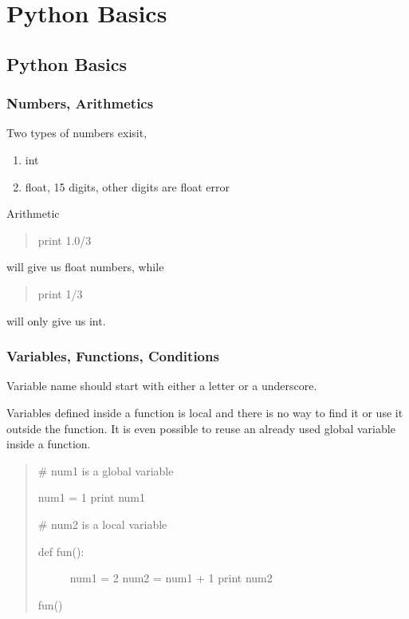 \documentclass[letterpaper,12pt,english]{sphinxmanual}
\begin{document}
\chapter{Python Basics}
\label{\detokenize{python/index::doc}}\label{\detokenize{python/index:python-basics}}

\section{Python Basics}
\label{\detokenize{python/python-basics::doc}}\label{\detokenize{python/python-basics:python-basics}}

\subsection{Numbers, Arithmetics}
\label{\detokenize{python/python-basics:numbers-arithmetics}}
Two types of numbers exisit,
\begin{enumerate}
\item {} 
int

\item {} 
float, 15 digits, other digits are float error

\end{enumerate}

Arithmetic
\begin{quote}

print 1.0/3
\end{quote}

will give us float numbers, while
\begin{quote}

print 1/3
\end{quote}

will only give us int.


\subsection{Variables, Functions, Conditions}
\label{\detokenize{python/python-basics:variables-functions-conditions}}
Variable name should start with either a letter or a underscore.

Variables defined inside a function is local and there is no way to find it or use it outside the function. It is even possible to reuse an already used global variable inside a function.
\begin{quote}

\# num1 is a global variable

num1 = 1
print num1

\# num2 is a local variable
\begin{description}
\item[{def fun():}] \leavevmode
num1 = 2
num2 = num1 + 1
print num2

\end{description}

fun()
\end{quote}
\end{document}
